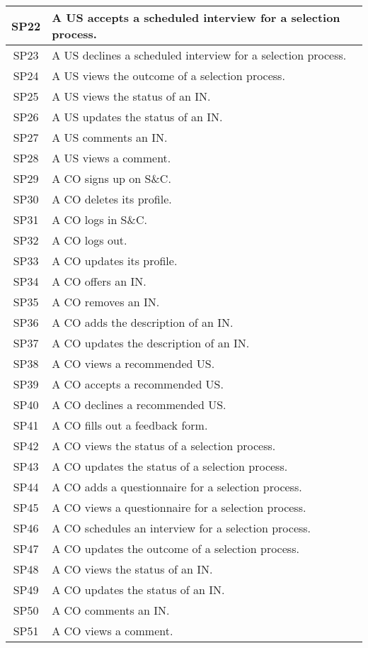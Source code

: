 \begin{longtable}{|c|p{10.5cm}|}
    SP22 & A US accepts a scheduled interview for a selection process. \\ \hline
    SP23 & A US declines a scheduled interview for a selection process. \\ \hline
    SP24 & A US views the outcome of a selection process. \\ \hline
    SP25 & A US views the status of an IN. \\ \hline
    SP26 & A US updates the status of an IN. \\ \hline
    SP27 & A US comments an IN. \\ \hline
    SP28 & A US views a comment. \\ \hline

    SP29 & A CO signs up on S\&C. \\ \hline
    SP30 & A CO deletes its profile. \\ \hline
    SP31 & A CO logs in S\&C. \\ \hline
    SP32 & A CO logs out. \\ \hline
    SP33 & A CO updates its profile. \\ \hline
    SP34 & A CO offers an IN. \\ \hline
    SP35 & A CO removes an IN. \\ \hline
    SP36 & A CO adds the description of an IN. \\ \hline
    SP37 & A CO updates the description of an IN. \\ \hline
    SP38 & A CO views a recommended US. \\ \hline
    SP39 & A CO accepts a recommended US. \\ \hline
    SP40 & A CO declines a recommended US. \\ \hline
    SP41 & A CO fills out a feedback form. \\ \hline
    SP42 & A CO views the status of a selection process. \\ \hline
    SP43 & A CO updates the status of a selection process. \\ \hline
    SP44 & A CO adds a questionnaire for a selection process. \\ \hline
    SP45 & A CO views a questionnaire for a selection process. \\ \hline
    SP46 & A CO schedules an interview for a selection process. \\ \hline
    SP47 & A CO updates the outcome of a selection process. \\ \hline
    SP48 & A CO views the status of an IN. \\ \hline
    SP49 & A CO updates the status of an IN. \\ \hline
    SP50 & A CO comments an IN. \\ \hline
    SP51 & A CO views a comment. \\ \hline
    

\end{longtable}
